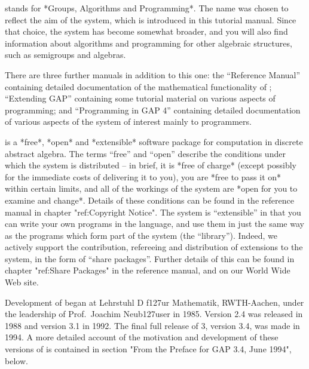
{\GAP} stands  for  *Groups, Algorithms  and Programming*.  The  name was
chosen to reflect  the aim of  the  system, which  is introduced in  this
tutorial manual.  Since  that  choice,  the  system has become   somewhat
broader,    and  you will  also   find information   about algorithms and
programming  for other   algebraic structures,   such as semigroups   and
algebras.

There are three further manuals in addition to  this one: the ``Reference
Manual''    containing   detailed  documentation     of  the mathematical
functionality   of {\GAP}; ``Extending   GAP''  containing  some tutorial
material on various aspects  of {\GAP} programming; and  ``Programming in
GAP 4''   containing detailed documentation   of various aspects   of the
system of interest mainly to programmers.

{\GAP}  is  a  *free*, *open*  and    *extensible*  software package  for
computation  in  discrete abstract  algebra.    The terms ``free''  and
``open'' describe the conditions under which the system is distributed --
in brief, it is *free of charge* (except possibly for the immediate costs
of delivering it to  you), you are *free  to pass  it on* within  certain
limits,  and all  of the  workings of  the  system are  *open  for you to
examine and   change*. Details of these  conditions  can be  found in the
reference     manual in chapter "ref:Copyright  Notice".    The system is
``extensible''  in that  you can write  your  own programs in the  {\GAP}
language, and use them  in just the same way  as the programs  which form
part of  the system  (the  ``library''). Indeed,  we actively support the
contribution, refereeing and distribution of extensions to the system, in
the form of ``share packages''.  Further details of  this can be found in
chapter  "ref:Share Packages" in the  reference manual,  and on our World
Wide Web site.

Development of {\GAP} began at Lehrstuhl D f\accent127ur Mathematik, RWTH-Aachen,
under the leadership of Prof.~Joachim Neub\accent127user in 1985. Version 2.4 was
released in 1988 and   version 3.1 in 1992.  The  final full release   of
{\GAP} 3, version 3.4, was  made in 1994. A more  detailed account of the
motivation and development  of these versions  of {\GAP} is contained  in
section "From the Preface for GAP 3.4, June 1994", below.

